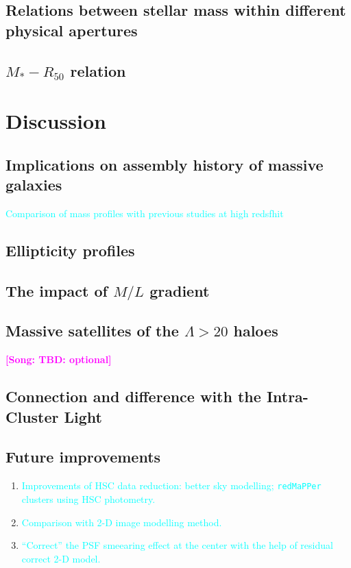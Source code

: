 \documentclass[preprint]{aastex}
\newcommand{\plan}[1]{\textcolor{cyan}{#1}}
\newcommand{\song}[1]{\textcolor{magenta}{\textbf{[Song: #1]}}}
\begin{document}
\begin{CJK*}{UTF8}{gbsn}
\subsection{Relations between stellar mass within different physical apertures}

\subsection{$M_{\ast}-R_{\mathrm{50}}$ relation}


\section{Discussion}

\subsection{Implications on assembly history of massive galaxies}

    \plan{Comparison of mass profiles with previous studies at high redsfhit}

\subsection{Ellipticity profiles}

\subsection{The impact of $M/L$ gradient}

\subsection{Massive satellites of the $\Lambda > 20$ haloes}
\song{TBD: optional}

\subsection{Connection and difference with the Intra-Cluster Light}

\subsection{Future improvements}

    \begin{enumerate}
        \item \plan{Improvements of HSC data reduction: better sky modelling; 
            \texttt{redMaPPer} clusters using HSC photometry.}
        \item \plan{Comparison with 2-D image modelling method.}
        \item \plan{``Correct'' the PSF smeearing effect at the center with the help of 
            residual correct 2-D model.}
    \end{enumerate}


\end{CJK*}
\end{document}
